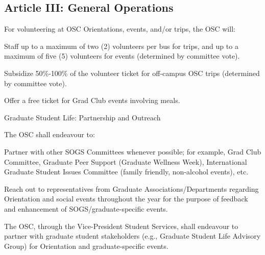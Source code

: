 \subsection{Article III: General Operations}
\begin{longenum}[ label*=\thesubsection.\arabic*., align=left] 
	\item For volunteering at OSC Orientations, events, and/or trips, the OSC will:
		\begin{longenum}[label*=\arabic*., align=left]
		\item Staff up to a maximum of two (2) volunteers per bus for trips, and up to a maximum of five (5) volunteers for events (determined by committee vote).
		\item Subsidize 50\%-100\% of the volunteer ticket for off-campus OSC trips (determined by committee vote).
		\item Offer a free ticket for Grad Club events involving meals.
		\end{longenum}
	\item Graduate Student Life: Partnership and Outreach
		\begin{longenum}[label*=\arabic*., align=left]
		\item The OSC shall endeavour to:
			\begin{longenum}[label*=\arabic*., align=left]
			\item Partner with other SOGS Committees whenever possible; for example, Grad Club Committee, Graduate Peer Support (Graduate Wellness Week), International Graduate Student Issues Committee (family friendly, non-alcohol events), etc.
			\item Reach out to representatives from Graduate Associations/Departments regarding Orientation and social events throughout the year for the purpose of feedback and enhancement of SOGS/graduate-specific events.
			\end{longenum}
		\item The OSC, through the Vice-President Student Services, shall endeavour to partner with graduate student stakeholders (e.g., Graduate Student Life Advisory Group) for Orientation and graduate-specific events.
		\end{longenum}
	\end{longenum}

